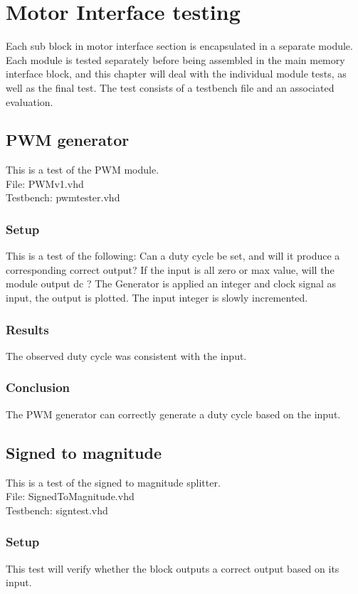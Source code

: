 \chapter{Motor Interface testing} \label{sec:llctest}
Each sub block in motor interface section is encapsulated in a separate module.
Each module is tested separately before being assembled in the main memory interface block, and this chapter will deal with the individual module tests, as well as the final test.
The test consists of a testbench file and an associated evaluation.

\section{PWM generator}
This is a test of the PWM module.\\
File: PWMv1.vhd\\
Testbench: pwmtester.vhd
\subsection*{Setup}
This is a test of the following: Can a duty cycle be set, and will it produce a corresponding correct output?
If the input is all zero or max value, will the module output dc ?
The Generator is applied an integer and clock signal as input, the output is plotted. The input integer is slowly incremented.
\subsection*{Results}
The observed duty cycle was consistent with the input.
\subsection*{Conclusion}
The PWM generator can correctly generate a duty cycle based on the input.



\section{Signed to magnitude}
This is a test of the signed to magnitude splitter.\\
File: SignedToMagnitude.vhd\\
Testbench: signtest.vhd

\subsection*{Setup}
This test will verify whether the block outputs a correct output based on its input.

